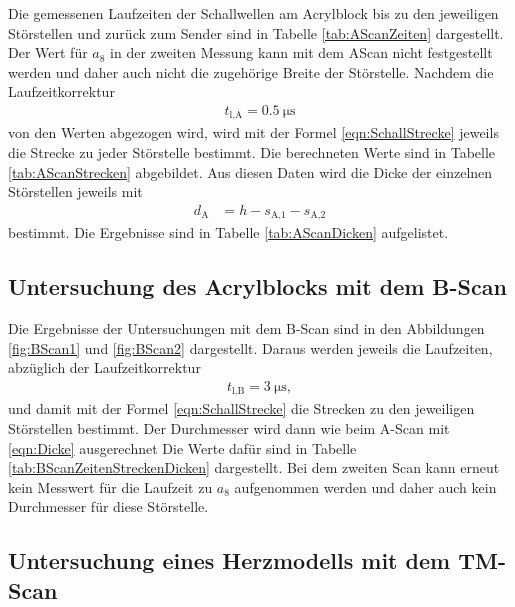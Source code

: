 Die gemessenen Laufzeiten der Schallwellen am Acrylblock bis zu den jeweiligen
Störstellen und zurück zum Sender sind in Tabelle \ref{tab:AScanZeiten} dargestellt.
Der Wert für $a_8$ in der zweiten Messung kann mit dem AScan nicht festgestellt
werden und daher auch nicht die zugehörige Breite der Störstelle.
Nachdem die Laufzeitkorrektur
\begin{align}
  t_\text{l,A} = \SI{0.5}{\micro\second}
\end{align}
von den Werten abgezogen wird, wird mit der Formel \eqref{eqn:SchallStrecke}
jeweils die Strecke zu jeder Störstelle bestimmt.
Die berechneten Werte sind in Tabelle \ref{tab:AScanStrecken}
abgebildet.
Aus diesen Daten wird die Dicke der einzelnen Störstellen jeweils mit
\begin{align}
  d_\text{A} & = h - s_\text{A,1} - s_\text{A,2}
  \label{eqn:Dicke}
\end{align}
bestimmt. Die Ergebnisse sind in Tabelle \ref{tab:AScanDicken} aufgelistet.

\subsection{Untersuchung des Acrylblocks mit dem B-Scan}

Die Ergebnisse der Untersuchungen mit dem B-Scan sind in den Abbildungen
\ref{fig:BScan1} und \ref{fig:BScan2} dargestellt.
Daraus werden jeweils die Laufzeiten, abzüglich der Laufzeitkorrektur
\begin{align}
  t_\text{l,B} = \SI{3}{\micro\second},
\end{align}
und damit mit der Formel
\ref{eqn:SchallStrecke} die Strecken zu den
jeweiligen Störstellen bestimmt. Der Durchmesser wird dann wie beim A-Scan mit
\eqref{eqn:Dicke} ausgerechnet
Die Werte dafür sind in Tabelle \ref{tab:BScanZeitenStreckenDicken}
dargestellt. Bei dem zweiten Scan kann erneut kein Messwert für die Laufzeit
zu $a_8$ aufgenommen werden und daher auch kein Durchmesser für diese
Störstelle.

\subsection{Untersuchung eines Herzmodells mit dem TM-Scan}

